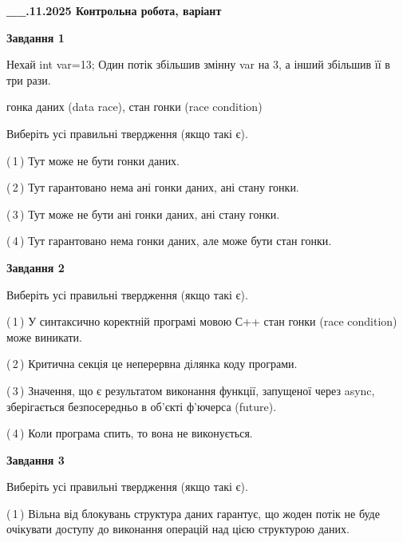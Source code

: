 \documentclass[12pt, ukrainian]{article}
\begin{document}
\begin {large}

\textbf{\_\_.11.2025 Контрольна робота, варіант  }\par


{

\begin{center}
\textbf{Завдання 1}
\end{center}
Нехай int var=13; Один потік збільшив змінну var на 3, а інший збільшив її в три рази.

гонка даних (data race), стан гонки (race condition)

Виберіть усі правильні твердження (якщо такі є).\par
\vspace{2mm}
(\,1\,) Тут може не бути гонки даних.%

(\,2\,) Тут гарантовано нема ані гонки даних, ані стану гонки.%

(\,3\,) Тут може не бути ані гонки даних, ані стану гонки.%

(\,4\,) Тут гарантовано нема гонки даних, але може бути стан гонки.%



\begin{center}
\textbf{Завдання 2}
\end{center}
Виберіть усі правильні твердження (якщо такі є).\par
\vspace{2mm}

(\,1\,) У синтаксично коректній програмі мовою С++ стан гонки (race condition) може виникати.%

(\,2\,) Критична секція це неперервна ділянка коду програми.%

(\,3\,) Значення, що є результатом виконання функції, запущеної через async, зберігається безпосередньо в об’єкті ф’ючерса (future).%

(\,4\,) Коли програма спить, то вона не виконується.%



\begin{center}
\textbf{Завдання 3}
\end{center}
Виберіть усі правильні твердження (якщо такі є).\par
\vspace{2mm}

(\,1\,) Вільна від блокувань структура даних гарантує, що жоден потік не буде очікувати доступу до виконання операцій над цією структурою даних.%

}
\end{large}
\end{document}
